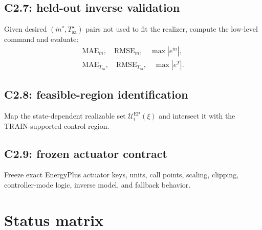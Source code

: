 \documentclass[11pt]{article}
\newcommand{\mdot}{\dot m}
\begin{document}
\subsection*{C2.7: held-out inverse validation}
Given desired $(\mdot^\star,T_{\mathrm{sa}}^\star)$ pairs not used to fit the realizer,
compute the low-level command and evaluate:
\begin{align}
\mathrm{MAE}_{\mdot},
\quad
\mathrm{RMSE}_{\mdot},
\quad
\max |e^{\mdot}|,
\\
\mathrm{MAE}_{T_{\mathrm{sa}}},
\quad
\mathrm{RMSE}_{T_{\mathrm{sa}}},
\quad
\max |e^T|.
\end{align}

\subsection*{C2.8: feasible-region identification}
Map the state-dependent realizable set
$\mathcal U_i^{\mathrm{EP}}(\xi)$ and intersect it with the TRAIN-supported
control region.

\subsection*{C2.9: frozen actuator contract}
Freeze exact EnergyPlus actuator keys, units, call points, scaling, clipping,
controller-mode logic, inverse model, and fallback behavior.

\section{Status matrix}
\end{document}
